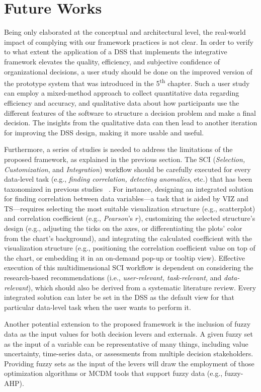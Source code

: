 \documentclass{sfuthesis}
\begin{document}
\section{Future Works}
Being only elaborated at the conceptual and architectural level, the real-world impact of complying with our framework practices is not clear. In order to verify to what extent the application of a DSS that implements the integrative framework elevates the quality, efficiency, and subjective confidence of organizational decisions, a user study should be done on the improved version of the prototype system that was introduced in the 5\textsuperscript{th} chapter. Such a user study can employ a mixed-method approach to collect quantitative data regarding efficiency and accuracy, and qualitative data about how participants use the different features of the software to structure a decision problem and make a final decision. The insights from the qualitative data can then lead to another iteration for improving the DSS design, making it more usable and useful.\par
Furthermore, a series of studies is needed to address the limitations of the proposed framework, as explained in the previous section. The SCI (\textit{Selection, Customization}, and \textit{Integration}) workflow should be carefully executed for every data-level task (e.g., \textit{finding correlation, detecting anomalies}, etc.) that has been taxonomized in previous studies ~\cite{amar_low-level_2005,brehmer2013multi}. For instance, designing an integrated solution for finding correlation between data variables—a task that is aided by VIZ and TS—requires selecting the most suitable visualization structure (e.g., scatterplot) and correlation coefficient (e.g., \textit{Pearson}’s $r$), customizing the selected structure’s design (e.g., adjusting the ticks on the axes, or differentiating the plots’ color from the chart’s background), and integrating the calculated coefficient with the visualization structure (e.g., positioning the correlation coefficient value on top of the chart, or embedding it in an on-demand pop-up or tooltip view). Effective execution of this multidimensional SCI workflow is dependent on considering the research-based recommendations (i.e., \textit{user-relevant, task-relevant,} and \textit{data-relevant}), which should also be derived from a systematic literature review. Every integrated solution can later be set in the DSS as the default view for that particular data-level task when the user wants to perform it.\par
Another potential extension to the proposed framework is the inclusion of fuzzy data as the input values for both decision levers and externals. A given fuzzy set as the input of a variable can be representative of many things, including value uncertainty, time-series data, or assessments from multiple decision stakeholders. Providing fuzzy sets as the input of the levers will draw the employment of those optimization algorithms or MCDM tools that support fuzzy data (e.g., fuzzy-AHP).
\end{document}
